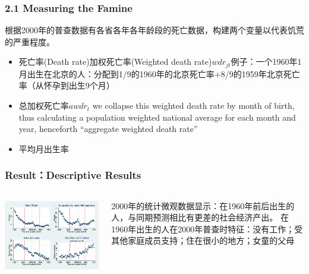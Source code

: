 \documentclass{beamer}
\begin{document}
\begin{frame}
	\frametitle{2.1 Measuring the Famine}
    根据2000年的普查数据有各省各年各年龄段的死亡数据，构建两个变量以代表饥荒的严重程度。
\begin{itemize}
	\item 死亡率(Death rate)加权死亡率(Weighted death rate)$wdr_{jt}$例子：一个1960年1月出生在北京的人：分配到1/9的1960年的北京死亡率+8/9的1959年北京死亡率（从怀孕到出生9个月）
	\item 总加权死亡率$awdr_{t}$ we collapse this weighted death rate by month of birth, thus calculating a population weighted national average for each month and year, henceforth “aggregate weighted death rate” 
	\item 平均月出生率
\end{itemize}
\end{frame}


\begin{frame}
\frametitle{Result：Descriptive Results}
	\begin{columns}
            \begin{minipage}[c][0.4\textheight][c]{\linewidth}
                \centering
                \includegraphics[width=0.9\linewidth]{figure5}
            \end{minipage}
           
           	\begin{minipage}[c][0.4\textheight][c]{\linewidth}
            2000年的统计微观数据显示：在1960年前后出生的人，与同期预测相比有更差的社会经济产出。
            在1960年出生的人在2000年普查时特征：没有工作；受其他家庭成员支持；住在很小的地方；女童的父母
            \end{minipage}
    \end{columns}
\end{frame}
\end{document}
